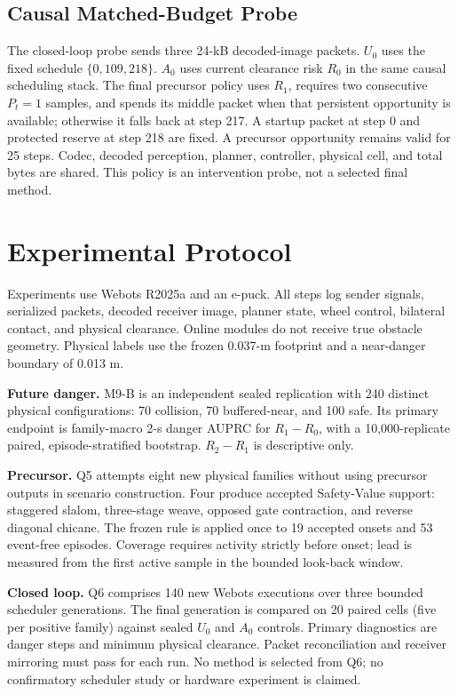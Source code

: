 \documentclass[letterpaper,10pt,conference]{ieeeconf}
\begin{document}
\subsection{Causal Matched-Budget Probe}
The closed-loop probe sends three 24-kB decoded-image packets. $U_0$ uses the
fixed schedule $\{0,109,218\}$. $A_0$ uses current clearance risk $R_0$ in the
same causal scheduling stack. The final precursor policy uses $R_1$, requires
two consecutive $P_t=1$ samples, and spends its middle packet when that
persistent opportunity is available; otherwise it falls back at step 217. A
startup packet at step 0 and protected reserve at step 218 are fixed. A
precursor opportunity remains valid for 25 steps. Codec, decoded perception,
planner, controller, physical cell, and total bytes are shared. This policy is
an intervention probe, not a selected final method.

\section{Experimental Protocol}

Experiments use Webots R2025a and an e-puck. All steps log sender signals,
serialized packets, decoded receiver image, planner state, wheel control,
bilateral contact, and physical clearance. Online modules do not receive true
obstacle geometry. Physical labels use the frozen 0.037-m footprint and a
near-danger boundary of 0.013 m.

\textbf{Future danger.} M9-B is an independent sealed replication with 240
distinct physical configurations: 70 collision, 70 buffered-near, and 100
safe. Its primary endpoint is family-macro 2-s danger AUPRC for $R_1-R_0$,
with a 10,000-replicate paired, episode-stratified bootstrap. $R_2-R_1$ is
descriptive only.

\textbf{Precursor.} Q5 attempts eight new physical families without using
precursor outputs in scenario construction. Four produce accepted Safety-Value
support: staggered slalom, three-stage weave, opposed gate contraction, and
reverse diagonal chicane. The frozen rule is applied once to 19 accepted onsets
and 53 event-free episodes. Coverage requires activity strictly before onset;
lead is measured from the first active sample in the bounded look-back window.

\textbf{Closed loop.} Q6 comprises 140 new Webots executions over three
bounded scheduler generations. The final generation is compared on 20 paired
cells (five per positive family) against sealed $U_0$ and $A_0$ controls.
Primary diagnostics are danger steps and minimum physical clearance. Packet
reconciliation and receiver mirroring must pass for each run. No method is
selected from Q6; no confirmatory scheduler study or hardware experiment is
claimed.
\end{document}
